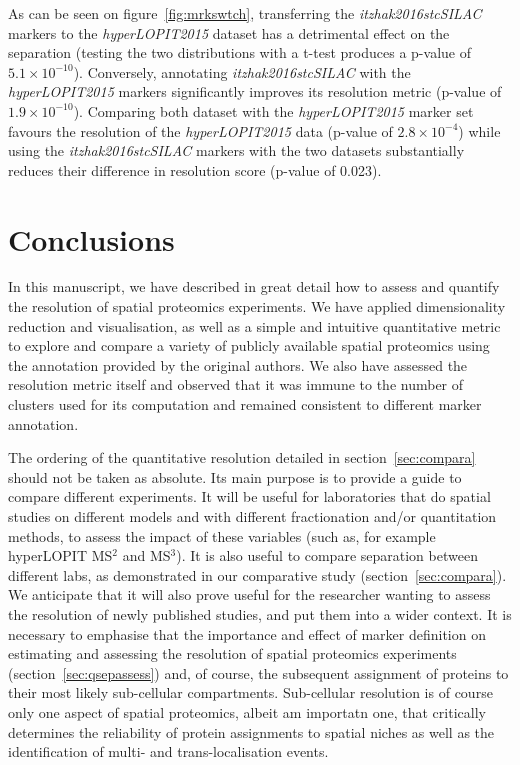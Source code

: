 \documentclass[12pt]{article}\usepackage[]{graphicx}\usepackage[]{color}
\begin{document}
As can be seen on figure~\ref{fig:mrkswtch}, transferring the
\textit{itzhak2016stcSILAC} markers to the \textit{hyperLOPIT2015}
dataset has a detrimental effect on the separation (testing the two
distributions with a t-test produces a p-value of \ensuremath{5.1\times 10^{-10}}). Conversely, annotating \textit{itzhak2016stcSILAC} with the
\textit{hyperLOPIT2015} markers significantly improves its resolution
metric (p-value of \ensuremath{1.9\times 10^{-10}}). Comparing both dataset
with the \textit{hyperLOPIT2015} marker set favours the resolution of
the \textit{hyperLOPIT2015} data (p-value of \ensuremath{2.8\times 10^{-4}})
while using the \textit{itzhak2016stcSILAC} markers with the two
datasets substantially reduces their difference in resolution score
(p-value of 0.023).

\section{Conclusions}

In this manuscript, we have described in great detail how to assess
and quantify the resolution of spatial proteomics experiments. We have
applied dimensionality reduction and visualisation, as well as a
simple and intuitive quantitative metric to explore and compare a
variety of publicly available spatial proteomics using the annotation
provided by the original authors. We also have assessed the resolution
metric itself and observed that it was immune to the number of
clusters used for its computation and remained consistent to different
marker annotation.

The ordering of the quantitative resolution detailed in
section~\ref{sec:compara} should not be taken as absolute. Its main
purpose is to provide a guide to compare different experiments. It
will be useful for laboratories that do spatial studies on different
models and with different fractionation and/or quantitation methods,
to assess the impact of these variables (such as, for example
hyperLOPIT MS$^2$ and MS$^3$). It is also useful to compare separation
between different labs, as demonstrated in our comparative study
(section~\ref{sec:compara}). We anticipate that it will also prove
useful for the researcher wanting to assess the resolution of newly
published studies, and put them into a wider context. It is necessary
to emphasise that the importance and effect of marker definition on
estimating and assessing the resolution of spatial proteomics
experiments (section~\ref{sec:qsepassess}) and, of course, the
subsequent assignment of proteins to their most likely sub-cellular
compartments. Sub-cellular resolution is of course only one aspect of
spatial proteomics, albeit am importatn one, that critically
determines the reliability of protein assignments to spatial niches as
well as the identification of multi- and trans-localisation events.
\end{document}
